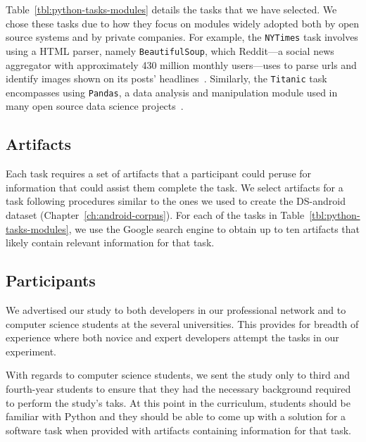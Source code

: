 Table~\ref{tbl:python-tasks-modules} details the tasks that we have selected. 
We chose these tasks due to how they focus on modules widely adopted both by open source systems and by private companies.
For example, the \texttt{NYTimes} task involves using a HTML parser, namely \texttt{BeautifulSoup},
which Reddit---a social news aggregator with approximately 430 million monthly users---uses 
to parse urls and identify images shown on its posts' headlines~\cite{bs4-reddit}. 
Similarly, the \texttt{Titanic} task encompasses using \texttt{Pandas}, a data analysis and manipulation module
used in many open source data science projects~\cite{ma2017, shrestha2020}.













\subsection{Artifacts}
\label{sec:experiment-artifacts}


Each task requires a set of artifacts that a participant could peruse for information that could assist them complete the task.
We select artifacts for a task following procedures similar to the ones we used to create the \acs{DS-android} dataset (Chapter~\ref{ch:android-corpus}). 
For each of the tasks in Table~\ref{tbl:python-tasks-modules}, we use the Google search engine to obtain up to ten artifacts that likely contain relevant
information for that task. 






\subsection{Participants}



We advertised our study to both developers in our professional network and to computer science students at the several universities. 
This provides for breadth of experience where both novice and expert developers attempt the tasks in our experiment. 


With regards to computer science students, we sent the study only to third and fourth-year students to ensure that they had the necessary background required to perform the study's taks.
At this point in the curriculum, students should be familiar with Python and they should be able to come up with a solution 
for a software task when provided with artifacts containing information for that task.


